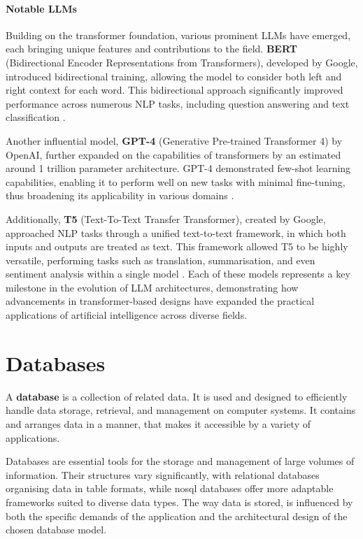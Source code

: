 \begin{definition}
\paragraph{Notable LLMs} Building on the transformer foundation, various prominent LLMs have emerged, each bringing unique features and contributions to the field. \textbf{BERT} (Bidirectional Encoder Representations from Transformers), developed by Google, introduced bidirectional training, allowing the model to consider both left and right context for each word. This bidirectional approach significantly improved performance across numerous NLP tasks, including question answering and text classification \citep{devlin2019bert}. 

Another influential model, \textbf{GPT-4} (Generative Pre-trained Transformer 4) by OpenAI, further expanded on the capabilities of transformers by an estimated around 1 trillion parameter architecture. GPT-4 demonstrated few-shot learning capabilities, enabling it to perform well on new tasks with minimal fine-tuning, thus broadening its applicability in various domains \citep{brown2020gpt3}. 

Additionally, \textbf{T5} (Text-To-Text Transfer Transformer), created by Google, approached NLP tasks through a unified text-to-text framework, in which both inputs and outputs are treated as text. This framework allowed T5 to be highly versatile, performing tasks such as translation, summarisation, and even sentiment analysis within a single model \citep{raffel2020t5}. Each of these models represents a key milestone in the evolution of LLM architectures, demonstrating how advancements in transformer-based designs have expanded the practical applications of artificial intelligence across diverse fields.

\section{Databases}\label{sec:databases}
\begin{definition}\label{def:database}
    A \textbf{database} is a collection of related data\citep{limited2010introduction}. 
    It is used and designed to efficiently handle data storage, retrieval, and management on computer systems. 
    It contains and arranges data in a manner, that makes it accessible by a variety of applications.
\end{definition}
Databases are essential tools for the storage and management of large volumes of information. 
Their structures vary significantly, with relational databases organising data in table formats, while \ac{nosql} databases offer more adaptable frameworks suited to diverse data types. 
The way data is stored, is influenced by both the specific demands of the application and the architectural design of the chosen database model.

\end{definition}
